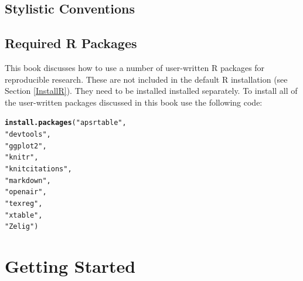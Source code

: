 \documentclass[ChapterTOCs,krantz1]{krantz}\usepackage{graphicx, color}
\makeatletter
\newcommand{\hlfunctioncall}[1]{\textcolor[rgb]{0.501960784313725,0,0.329411764705882}{\textbf{#1}}}%
\newcommand{\hlstring}[1]{\textcolor[rgb]{0.6,0.6,1}{#1}}%
\newenvironment{kframe}{%
 \def\at@end@of@kframe{}%
 \ifinner\ifhmode%
  \def\at@end@of@kframe{\end{minipage}}%
  \begin{minipage}{\columnwidth}%
 \fi\fi%
 \def\FrameCommand##1{\hskip\@totalleftmargin \hskip-\fboxsep
 \colorbox{shadecolor}{##1}\hskip-\fboxsep
     \hskip-\linewidth \hskip-\@totalleftmargin \hskip\columnwidth}%
 \MakeFramed {\advance\hsize-\width
   \@totalleftmargin\z@ \linewidth\hsize
   \@setminipage}}%
 {\par\unskip\endMakeFramed%
 \at@end@of@kframe}
\newenvironment{knitrout}{}{} %
\makeatother
\begin{document}
\chapter*{Stylistic Conventions}\label{StylisticConventions}
\begin{noindent}









\chapter*{Required R Packages}\label{ReqPackages}

This book discusses how to use a number of user-written R packages for reproducible research. These are not included in the default R installation (see Section \ref{InstallR}). They need to be installed installed separately. To install all of the user-written packages discussed in this book use the following code:

\begin{knitrout}
\color{fgcolor}\begin{kframe}
\begin{alltt}
\hlfunctioncall{install.packages}(\hlstring{"apsrtable"}, 
                \hlstring{"devtools"}, 
                \hlstring{"ggplot2"}, 
                \hlstring{"knitr"}, 
                \hlstring{"knitcitations"}, 
                \hlstring{"markdown"}, 
                \hlstring{"openair"}, 
                \hlstring{"texreg"},                     
                \hlstring{"xtable"}, 
                \hlstring{"Zelig"})
\end{alltt}
\end{kframe}
\end{knitrout}






\end{noindent}

\listoffigures
\listoftables
\tableofcontents

\mainmatter

\setcounter{page}{1}

\part{Getting Started}

\end{document}
